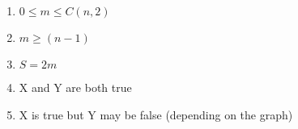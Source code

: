 \documentclass[11pt]{article}
\begin{document}
\begin{enumerate}
    \item $0 \leq m \leq C(n,2)$
    \item $m \geq (n-1)$
    \item $S = 2m$
    \item X and Y are both true
    \item X is true but Y may be false (depending on the graph)
\end{enumerate}
\end{document}
